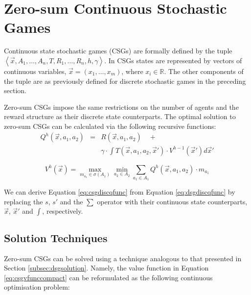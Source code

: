 \section{Zero-sum Continuous Stochastic Games}
\label{sec:csg}

Continuous state stochastic games (CSGs) are formally defined by the tuple
$ \left\langle \vec{x}, A_{1}, \ldots, A_{n}, T, R_{1}, \ldots, R_{n}, h, \gamma  \right\rangle$.
In CSGs states are represented by vectors of continuous variables, $\vec{x} = \left(x_1, \ldots, x_m \right)$, 
where $x_i \in \mathbb{R}$. The other components of the tuple are as 
previously defined for discrete stochastic games in the preceding section.

Zero-sum CSGs impose the same restrictions on the number of agents
and the reward structure as their discrete state counterparts. The 
optimal solution to zero-sum CSGs can be calculated via the 
following recursive functions:
{\footnotesize 
\abovedisplayskip=10pt
\belowdisplayskip=0pt
\begin{eqnarray}
\label{eq:csgdiscqfunc}
  Q^{h}(\vec{x}, a_1, a_2) &=& R(\vec{x}, a_1, a_2) \quad + \nonumber \\
  && \gamma \cdot \int T(\vec{x}, a_1, a_2, \vec{x}') \cdot V^{h-1}(\vec{x}') d\vec{x}' 
\end{eqnarray}
}%

{\footnotesize 
\abovedisplayskip=0pt
\belowdisplayskip=0pt
\begin{equation}
\label{eq:csgvfunccompact}
  V^{h}(\vec{x}) = \max_{m_{a_{1}} \in \sigma(A_1)} \min_{a_2 \in A_2} \sum_{a_1 \in A_1} Q^{h}(\vec{x}, a_1, a_2) \cdot m_{a_{1}}
\end{equation}
}%

We can derive Equation \eqref{eq:csgdiscqfunc} from Equation \eqref{eq:dsgdiscqfunc}
by replacing the $s$, $s'$ and the $\sum$ operator with their continuous
state counterparts, $\vec{x}$, $\vec{x}'$ and $\int$, respectively.
%

\subsection{Solution Techniques}

Zero-sum CSGs can be solved using a technique analogous to that 
presented in Section \ref{subsec:dsgsolution}. Namely, the value function in Equation
\eqref{eq:csgvfunccompact} can be reformulated as the following continuous 
optimisation problem:


